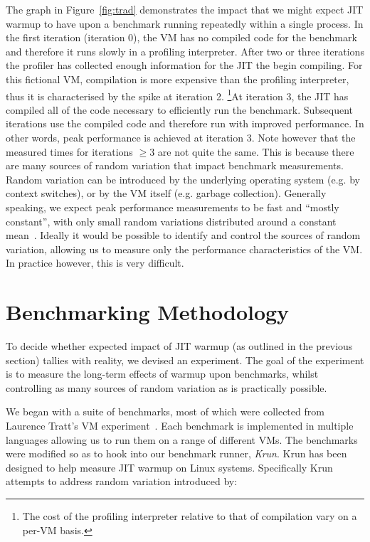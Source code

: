 \documentclass[10pt,preprint]{sigplanconf}
\begin{document}
The graph in Figure~\ref{fig:trad} demonstrates the impact that we might
expect JIT warmup to have upon a benchmark running repeatedly within a
single process. In the first iteration (iteration 0), the VM has no compiled
code for the benchmark and therefore it runs slowly in a profiling
interpreter. After two or three iterations the profiler has collected enough
information for the JIT the begin compiling. For this fictional VM,
compilation is more expensive than the profiling interpreter, thus it is
characterised by the spike at iteration 2. \footnote{The cost of
the profiling interpreter relative to that of compilation vary on a per-VM
basis.}At iteration 3, the JIT has compiled all of the code necessary to
efficiently run the benchmark. Subsequent iterations use the compiled code
and therefore run with improved performance. In other words, peak
performance is achieved at iteration 3. Note however that the measured times
for iterations $\geq 3$ are not quite the same. This is because there are many
sources of random variation that impact benchmark measurements. Random
variation can be introduced by the underlying operating system (e.g. by
context switches), or by the VM itself (e.g. garbage collection).  Generally
speaking, we expect peak performance measurements to be fast and ``mostly
constant'', with only small random variations distributed around a constant
mean~\cite{XXX}.  Ideally it would be possible to identify and control the
sources of random variation, allowing us to measure only the performance
characteristics of the VM. In practice however, this is very difficult.


\section{Benchmarking Methodology}
\label{sec:Benchmarking Methodology}

To decide whether expected impact of JIT warmup (as outlined in the previous
section) tallies with reality, we devised an experiment.  The goal of the
experiment is to measure the long-term effects of warmup upon benchmarks,
whilst controlling as many sources of random variation as is practically
possible.

We began with a suite of benchmarks, most of which were collected from Laurence
Tratt's VM experiment~\cite{XXX}. Each benchmark is implemented in multiple
languages allowing us to run them on a range of different VMs. The benchmarks
were modified so as to hook into our benchmark runner, \emph{Krun}. Krun has
been designed to
help measure JIT warmup on Linux systems. Specifically Krun attempts to address
random variation introduced by:
\end{document}
